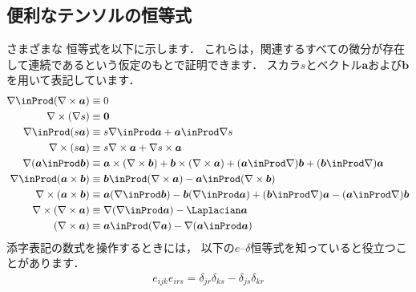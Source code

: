 \subsection{便利なテンソルの恒等式}
\label{ssec:1.3.8}
さまざまな
%
恒等式を以下に示します．
これらは，関連するすべての微分が存在して連続であるという仮定のもとで証明できます．
スカラ$s$とベクトル$\bm{a}$および$\bm{b}$を用いて表記しています．
\begin{align}
 \label{eq:1.29}
 \begin{aligned}
  \nabla \inProd (\nabla \times \bm{a}) &\equiv 0 \\
  \nabla \times (\nabla s) &\equiv \bm{0} \\
  \nabla \inProd (s\bm{a}) &\equiv s\nabla \inProd \bm{a} + \bm{a} \inProd \nabla s \\
  \nabla \times (s\bm{a}) &\equiv s\nabla \times \bm{a} + \nabla s \times \bm{a} \\
  \nabla (\bm{a} \inProd \bm{b})
    &\equiv \bm{a} \times (\nabla \times \bm{b}) + \bm{b} \times (\nabla \times \bm{a})
            + (\bm{a} \inProd \nabla)\bm{b} + (\bm{b} \inProd \nabla)\bm{a} \\
  \nabla \inProd (\bm{a} \times \bm{b})
    &\equiv \bm{b} \inProd (\nabla \times \bm{a}) - \bm{a} \inProd (\nabla \times \bm{b}) \\
  \nabla \times (\bm{a} \times \bm{b})
    &\equiv \bm{a}(\nabla \inProd \bm{b}) - \bm{b}(\nabla \inProd \bm{a})
            + (\bm{b} \inProd \nabla)\bm{a} - (\bm{a} \inProd \nabla)\bm{b} \\
  \nabla \times (\nabla \times \bm{a})
    &\equiv \nabla (\nabla \inProd \bm{a}) - \Laplacian\bm{a} \\
  (\nabla \times \bm{a})
    &\equiv \bm{a} \inProd (\nabla \bm{a}) - \nabla (\bm{a} \inProd \bm{a})
 \end{aligned}
\end{align}
添字表記の数式を操作するときには，
以下の$e$--$\delta$恒等式を知っていると役立つことがあります．
\begin{align}
 \label{eq:1.30}
 e_{ijk}e_{irs} = \delta_{jr}\delta_{ks} - \delta_{js}\delta_{kr}
\end{align}


